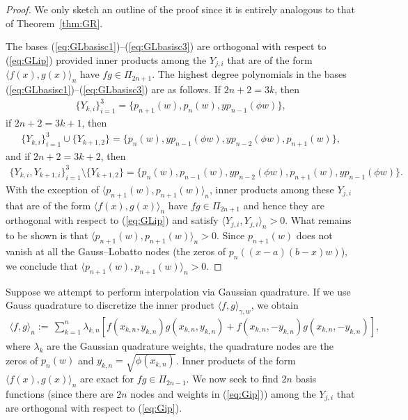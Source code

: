 \documentclass{amsart}
\theoremstyle{remark}
\def\la{{\langle}}
\def\ra{{\rangle}}
\def\g{{\gamma}}
\def\la{{\langle}}
\def\ra{{\rangle}}
\begin{document}
\begin{proof}
We only sketch an outline of the proof since it is entirely analogous to that of Theorem~\ref{thm:GR}.

The bases (\ref{eq:GLbasisc1})--(\ref{eq:GLbasisc3}) are orthogonal with respect to (\ref{eq:GLip}) provided inner products among the $Y_{j,i}$ that are of the form $\la f(x), g(x) \ra_{n}$  have $fg \in \Pi_{2n+1}$. The highest degree polynomials in the bases (\ref{eq:GLbasisc1})--(\ref{eq:GLbasisc3}) are as follows. If $2n + 2 = 3k$, then 
\begin{align*}
\lbrace Y_{k,i} \rbrace_{i = 1}^{3} = \lbrace p_{n+1}(w), p_{n}( w), yp_{n-1}(\phi w)  \rbrace,
\end{align*}
if $2n + 2 = 3k + 1$, then
\begin{align*}
\lbrace Y_{k,i} \rbrace_{i = 1}^{3}\cup \lbrace Y_{k+1,2} \rbrace = \lbrace p_{n}(w), yp_{n-1}(\phi w), yp_{n-2}(\phi w), p_{n+1}( w)  \rbrace,
\end{align*}
and if  $2n + 2 = 3k + 2$, then
\begin{align*}
\lbrace Y_{k,i}, Y_{k+1,i} \rbrace_{i = 1}^{3}\setminus \lbrace Y_{k+1,2} \rbrace = \lbrace p_{n}(w), p_{n-1}( w), yp_{n-2}(\phi w), p_{n+1}(w), yp_{n-1}(\phi w)  \rbrace.
\end{align*}
With the exception of $\la p_{n+1}(w), p_{n+1}(w) \ra_n$, inner products among these $Y_{j,i}$ that are of the form $\la f(x), g(x) \ra_n$ have $fg \in \Pi_{2n+1}$  and hence they are orthogonal with respect to (\ref{eq:GLip}) and satisfy $\la Y_{j,i}, Y_{j,i} \ra_n > 0$. What remains to be shown is that $\la p_{n+1}(w), p_{n+1}(w) \ra_n > 0$. Since $p_{n+1}(w)$ does not vanish at all the Gauss--Lobatto nodes (the zeros of $p_n((x-a)(b-x)w)$), we conclude that $\la p_{n+1}(w), p_{n+1}(w) \ra_n > 0$.
\end{proof}
Suppose we attempt to perform interpolation via Gaussian quadrature.
If we  use Gauss quadrature to discretize the inner product $\la f, g \ra_{\g,w}$, we obtain 
\begin{align}
 \la f,g \ra_n :=\,\sum_{k=1}^n \lambda_{k,n}\left[ f(x_{k,n},y_{k,n})g(x_{k,n},y_{k,n}) + f(x_{k,n},-y_{k,n})g(x_{k,n},-y_{k,n}) \right],  \label{eq:Gip}
\end{align}
where $\lambda_k$ are the Gaussian quadrature weights, the quadrature nodes are the zeros of $p_n(w)$ and $y_{k,n} = \sqrt{\phi(x_{k,n})}$. Inner products of the form $\la f(x), g(x) \ra_n$ are exact for $fg \in \Pi_{2n-1}$. We now seek to find $2n$ basis functions (since there are $2n$ nodes and weights in (\ref{eq:Gip})) among the $Y_{j,i}$ that are orthogonal with respect to (\ref{eq:Gip}). 
\end{document}
